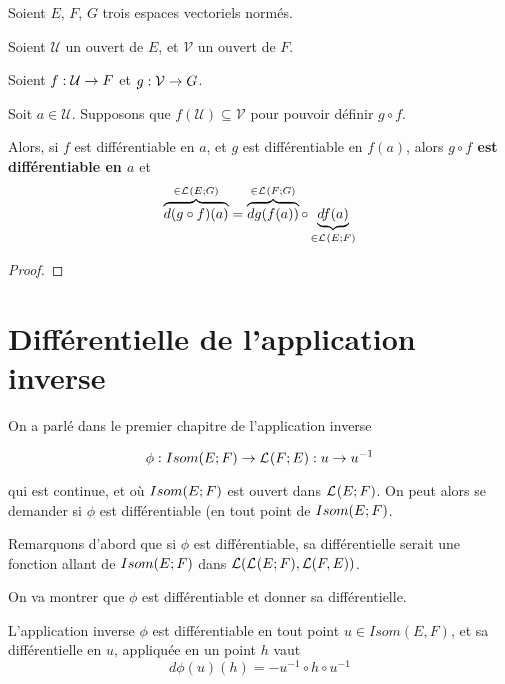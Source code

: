 \begin{theorem}
\label{theorem:chain_rule}
	Soient $E$, $F$, $G$ trois espaces vectoriels normés.

	Soient $\mathcal{U}$ un ouvert de $E$, et $\mathcal{V}$ un ouvert de $F$.

	Soient $f : \mathcal{U} \rightarrow F$ et
	$g : \mathcal{V} \rightarrow G$.

	Soit $a \in \mathcal{U}$.
	Supposons que $f(\mathcal{U}) \subseteq \mathcal{V}$ pour pouvoir définir $g
	\circ f$.

	Alors, si $f$ est différentiable en $a$, et $g$ est différentiable en
	$f(a)$, alors \textbf{$g \circ f$ est différentiable en $a$} et
	\begin{equation*}
		\overbrace{d(g \circ f)(a)}^{\in \mathcal{L}_{}(E; G)} =
		\overbrace{dg(f(a))}^{\in \mathcal{L}_{}(F; G)} \circ
		\underbrace{df(a)}_{\in \mathcal{L}_{}(E; F)}
	\end{equation*}
\end{theorem}

\ifdefined\outputproof
\begin{proof}

\end{proof}
\fi

\section{Différentielle de l'application inverse}

On a parlé dans le premier chapitre de l'application inverse

\begin{equation*}
	\phi : Isom(E; F) \rightarrow \mathcal{L}_{}(F; E) : u \rightarrow u^{-1}
\end{equation*}

qui est continue, et où $Isom(E; F)$ est ouvert dans
$\mathcal{L}_{}(E; F)$.
On peut alors se demander si $\phi$ est différentiable (en tout point de
$Isom(E; F)$.

Remarquons d'abord que si $\phi$ est différentiable, sa différentielle serait
une fonction allant de $Isom(E; F)$ dans $\mathcal{L}(\mathcal{L}_{}(E; F), \mathcal{L}(F,
E))$.

On va montrer que $\phi$ est différentiable et donner sa différentielle.

\begin{theorem}
\label{differential_inverse_application}
	L'application inverse $\phi$ est différentiable en tout point $u \in Isom(E,
	F)$, et sa différentielle en $u$, appliquée en un point $h$ vaut
	\begin{equation*}
		d\phi(u)(h) = -u^{-1} \circ h \circ u^{-1}
	\end{equation*}
\end{theorem}

